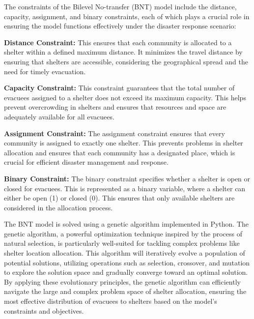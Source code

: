 The constraints of the Bilevel No-transfer (BNT) model include the distance, capacity, assignment, and binary constraints, each of which plays a crucial role in ensuring the model functions effectively under the disaster response scenario:

\textbf{Distance Constraint:} This ensures that each community is allocated to a shelter within a defined maximum distance. It minimizes the travel distance by ensuring that shelters are accessible, considering the geographical spread and the need for timely evacuation.

\textbf{Capacity Constraint: }This constraint guarantees that the total number of evacuees assigned to a shelter does not exceed its maximum capacity. This helps prevent overcrowding in shelters and ensures that resources and space are adequately available for all evacuees.

\textbf{Assignment Constraint: }The assignment constraint ensures that every community is assigned to exactly one shelter. This prevents problems in shelter allocation and ensures that each community has a designated place, which is crucial for efficient disaster management and response.

\textbf{Binary Constraint: } The binary constraint specifies whether a shelter is open or closed for evacuees. This is represented as a binary variable, where a shelter can either be open (1) or closed (0). This ensures that only available shelters are considered in the allocation process.

The BNT model is solved using a genetic algorithm implemented in Python. The genetic algorithm, a powerful optimization technique inspired by the process of natural selection, is particularly well-suited for tackling complex problems like shelter location allocation. This algorithm will iteratively evolve a population of potential solutions, utilizing operations such as selection, crossover, and mutation to explore the solution space and gradually converge toward an optimal solution. By applying these evolutionary principles, the genetic algorithm can efficiently navigate the large and complex problem space of shelter allocation, ensuring the most effective distribution of evacuees to shelters based on the model’s constraints and objectives.
